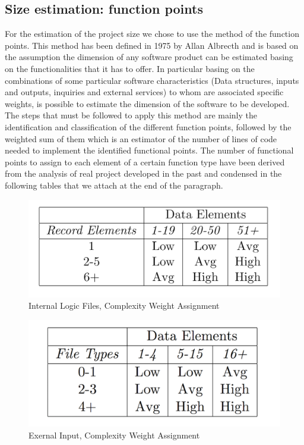 \documentclass[a4paper,10pt]{article}
\begin{document}
\subsection{Size estimation: function points}
For the estimation of the project size we chose to use the method of the function points. This method has been defined in 1975 by Allan Albrecth and is 
based on the assumption the dimension of any software product can be estimated basing on the functionalities that it has to offer. In particular
basing on the combinations of some particular software characteristics (Data structures, inputs and outputs, inquiries and external services)
to whom are associated specific weights, is possible to estimate the dimension of the software to be developed. The steps that must be followed to apply 
this method are mainly the identification and classification of the different function points, followed by the weighted sum of them which is an
estimator of the number of lines of code needed to implement the identified functional points. The number of functional points to
assign to each element of a certain function type have been derived from the analysis of real project
developed in the past and condensed in the following tables that we attach at the end of the paragraph.
  \bigskip
  \begin{figure}[h]
  \centering
    \includegraphics[scale=0.3]{Resources/ilf.png}
    \caption{Internal Logic Files, Complexity Weight Assignment}
  \end{figure}
  \begin{figure}[h]
  \centering
    \includegraphics[scale=0.46]{Resources/einpu.png}
    \caption{Exernal Input, Complexity Weight Assignment}
  \end{figure}
\end{document}
